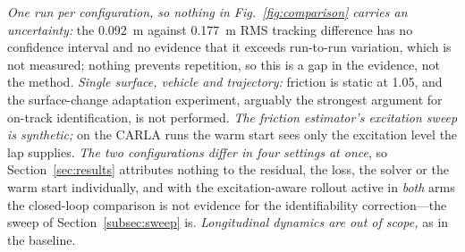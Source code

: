 \emph{One run per configuration, so nothing in Fig.~\ref{fig:comparison}
carries an uncertainty:} the \SI{0.092}{\meter} against \SI{0.177}{\meter} RMS
tracking difference has no confidence interval and no evidence that it exceeds
run-to-run variation, which is not measured; nothing prevents repetition, so
this is a gap in the evidence, not the method. \emph{Single surface, vehicle and trajectory:} friction is static at
\num{1.05}, and the surface-change adaptation experiment, arguably the
strongest argument for on-track identification, is not performed. \emph{The friction estimator's
excitation sweep is synthetic;} on the CARLA runs the warm start sees only the
excitation level the lap supplies. \emph{The two configurations differ in four
settings at once}, so Section~\ref{sec:results} attributes nothing to the
residual, the loss, the solver or the warm start individually, and with the
excitation-aware rollout active in \emph{both} arms the closed-loop comparison
is not evidence for the identifiability correction---the sweep of
Section~\ref{subsec:sweep} is. \emph{Longitudinal dynamics are out of scope,}
as in the baseline.

